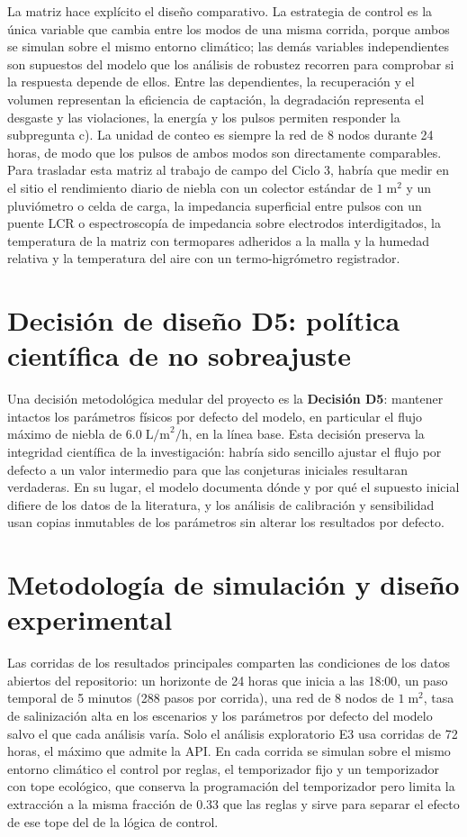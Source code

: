 La matriz hace expl\'icito el dise\~no comparativo. La estrategia de control es la \'unica variable que cambia entre los modos de una misma corrida, porque ambos se simulan sobre el mismo entorno clim\'atico; las dem\'as variables independientes son supuestos del modelo que los an\'alisis de robustez recorren para comprobar si la respuesta depende de ellos. Entre las dependientes, la recuperaci\'on y el volumen representan la eficiencia de captaci\'on, la degradaci\'on representa el desgaste y las violaciones, la energ\'ia y los pulsos permiten responder la subpregunta c). La unidad de conteo es siempre la red de 8 nodos durante 24 horas, de modo que los pulsos de ambos modos son directamente comparables. Para trasladar esta matriz al trabajo de campo del Ciclo 3, habr\'ia que medir en el sitio el rendimiento diario de niebla con un colector est\'andar de $1\;\text{m}^2$ y un pluvi\'ometro o celda de carga, la impedancia superficial entre pulsos con un puente LCR o espectroscop\'ia de impedancia sobre electrodos interdigitados, la temperatura de la matriz con termopares adheridos a la malla y la humedad relativa y la temperatura del aire con un termo-higr\'ometro registrador.

\section{Decisi\'on de dise\~no D5: pol\'itica cient\'ifica de no sobreajuste}
Una decisi\'on metodol\'ogica medular del proyecto es la \textbf{Decisi\'on D5}: mantener intactos los par\'ametros f\'isicos por defecto del modelo, en particular el flujo m\'aximo de niebla de $6.0\;\text{L/m}^2\text{/h}$, en la l\'inea base. Esta decisi\'on preserva la integridad cient\'ifica de la investigaci\'on: habr\'ia sido sencillo ajustar el flujo por defecto a un valor intermedio para que las conjeturas iniciales resultaran verdaderas. En su lugar, el modelo documenta d\'onde y por qu\'e el supuesto inicial difiere de los datos de la literatura, y los an\'alisis de calibraci\'on y sensibilidad usan copias inmutables de los par\'ametros sin alterar los resultados por defecto.

\section{Metodolog\'ia de simulaci\'on y dise\~no experimental}
\label{sec:metodo}
Las corridas de los resultados principales comparten las condiciones de los datos abiertos del repositorio: un horizonte de 24 horas que inicia a las 18:00, un paso temporal de 5 minutos (288 pasos por corrida), una red de 8 nodos de $1\;\text{m}^2$, tasa de salinizaci\'on alta en los escenarios y los par\'ametros por defecto del modelo salvo el que cada an\'alisis var\'ia. Solo el an\'alisis exploratorio E3 usa corridas de 72 horas, el m\'aximo que admite la API. En cada corrida se simulan sobre el mismo entorno clim\'atico el control por reglas, el temporizador fijo y un temporizador con tope ecol\'ogico, que conserva la programaci\'on del temporizador pero limita la extracci\'on a la misma fracci\'on de 0.33 que las reglas y sirve para separar el efecto de ese tope del de la l\'ogica de control.

